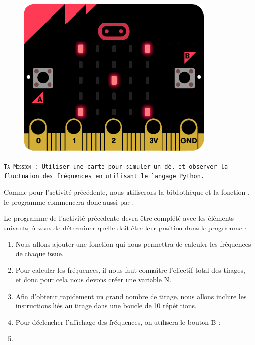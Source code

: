 \begin{figure}
    \includegraphics[width=\linewidth]{res/mbpy-de.png}
\end{figure}

\begin{eleve}    
    \texttt{\textsc{Ta Mission} : Utiliser une carte \mb  pour simuler un dé, et observer la fluctuaion des fréquences en utilisant le langage Python.}

Comme pour l'activité précédente, nous utiliserons la bibliothèque  et la fonction , le programme commencera donc aussi par :
     
Le programme de l'activité précédente devra être complété avec les éléments suivants, à vous de déterminer quelle doit être leur position dans le programme :

    \begin{enumerate}
    
    \item Nous allons ajouter une fonction qui nous permettra de calculer les fréquences de chaque issue.
    
    
    \item Pour calculer les fréquences, il nous faut connaître l'effectif total des tirages, et donc pour cela nous devons créer une variable N. 
    
    \item Afin d'obtenir rapidement un grand nombre de tirage, nous allons inclure les instructions liés au tirage dans une boucle de 10 répétitions.
    
    \item Pour déclencher l'affichage des fréquences, on utilisera le bouton B :
    
    
    \item 
    
    \end{enumerate}
    
    
    

\end{eleve}

